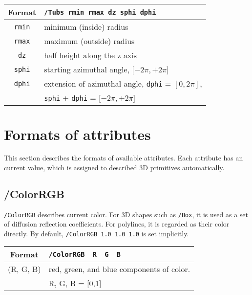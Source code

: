 \begin{tabular}{|c|l|}
\hline%
Format & \verb+/Tubs rmin rmax dz sphi dphi+\\
\hline%
\verb+rmin+  & minimum (inside)  radius \\
\hline%
\verb+rmax+  & maximum (outside) radius \\
\hline%
\verb+dz+    & half height along the z axis\\
\hline%
\verb+sphi+  & starting azimuthal angle, $[-2\pi, +2\pi$] \\
\hline%
\verb+dphi+  &  extension of azimuthal angle, \verb+dphi+ = $[0, 2\pi]$, \\
             &  \verb+sphi+ + \verb+dphi+ = $[-2\pi, +2\pi$] \\
\hline%
\end{tabular}


\section{Formats of attributes}

This section describes the formats of available attributes.
Each attribute has an current value,  
which is assigned to described 3D primitives automatically.  

\subsection{/ColorRGB}  
\verb+/ColorRGB+ describes current color.  
For 3D shapes such as \verb+/Box+,  
it is used as a set of diffusion reflection coefficients.  
For polylines, it is regarded as their color directly.
By default, \verb+/ColorRGB 1.0 1.0 1.0+ is set implicitly. 
\vspace{.20in}

\begin{tabular}{|c|l|}
\hline%
Format & \verb+/ColorRGB  R  G  B+\\
\hline%
(R, G, B) & red, green, and blue components of color. \\
          & R, G, B = [0,1] \\
\hline%
\end{tabular}



